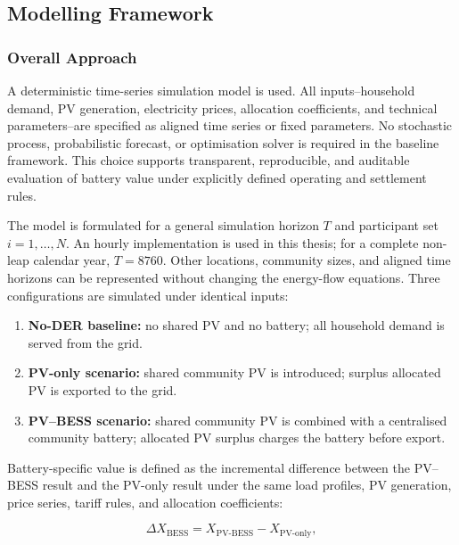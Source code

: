 \subsection{Modelling Framework}
\label{sec:modelling_framework}

\subsubsection{Overall Approach}
\label{subsec:overall_approach}

A deterministic time-series simulation model is used. All inputs--household demand, PV generation, electricity prices, allocation coefficients, and technical parameters--are specified as aligned time series or fixed parameters. No stochastic process, probabilistic forecast, or optimisation solver is required in the baseline framework. This choice supports transparent, reproducible, and auditable evaluation of battery value under explicitly defined operating and settlement rules.

The model is formulated for a general simulation horizon $T$ and participant set $i=1,\ldots,N$. An hourly implementation is used in this thesis; for a complete non-leap calendar year, $T=8760$. Other locations, community sizes, and aligned time horizons can be represented without changing the energy-flow equations. Three configurations are simulated under identical inputs:

\begin{enumerate}
    \item \textbf{No-DER baseline:} no shared PV and no battery; all household demand is served from the grid.
    \item \textbf{PV-only scenario:} shared community PV is introduced; surplus allocated PV is exported to the grid.
    \item \textbf{PV--BESS scenario:} shared community PV is combined with a centralised community battery; allocated PV surplus charges the battery before export.
\end{enumerate}

Battery-specific value is defined as the incremental difference between the PV--BESS result and the PV-only result under the same load profiles, PV generation, price series, tariff rules, and allocation coefficients:

\begin{equation}
\label{eq:delta_x_bess}
\Delta X_{\mathrm{BESS}} = X_{\mathrm{PV\mbox{-}BESS}} - X_{\mathrm{PV\mbox{-}only}},
\end{equation}


